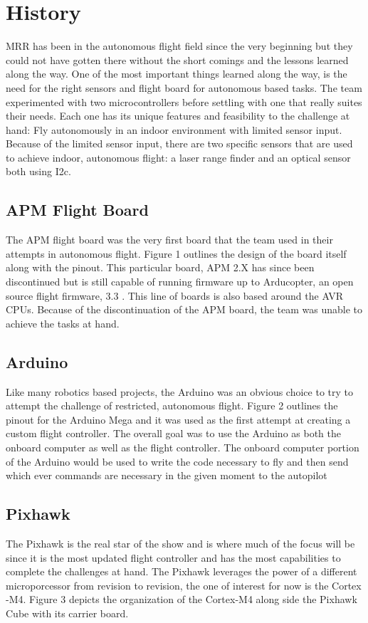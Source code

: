 \documentclass[conference,12pt, ]{IEEEtran}
\begin{document}
\section{History}
MRR has been in the autonomous flight field since the very beginning but they could not have gotten there without the short comings and the lessons learned along the way. One of the most important things learned along the way, is the need for the right sensors and flight board for autonomous based tasks. The team experimented with two microcontrollers before settling with one that really suites their needs. Each one has its unique features and feasibility to the challenge at hand: Fly autonomously in an indoor environment with limited sensor input. Because of the limited sensor input, there are two specific sensors that are used to achieve indoor, autonomous flight: a laser range finder and an optical sensor both using I2c.

\subsection{APM Flight Board}
The APM flight board was the very first board that the team used in their attempts in autonomous flight. Figure 1 outlines the design of the board itself along with the pinout. This particular board, APM 2.X has since been discontinued but is still capable of running firmware up to Arducopter, an open source flight firmware, 3.3 \cite{apm_board}. This line of boards is also based around the AVR CPUs. Because of the discontinuation of the APM board, the team was unable to achieve the tasks at hand. 

\subsection{Arduino}
Like many robotics based projects, the Arduino was an obvious choice to try to attempt the challenge of restricted, autonomous flight. Figure 2 outlines the pinout for the Arduino Mega and it was used as the first attempt at creating a custom flight controller. The overall goal was to use the Arduino as both the onboard computer as well as the flight controller. The onboard computer portion of the Arduino would be used to write the code necessary to fly and then send which ever commands are necessary in the given moment to the autopilot \cite{on_board}

\subsection{Pixhawk}
The Pixhawk is the real star of the show and is where much of the focus will be since it is the most updated flight controller and has the most capabilities to complete the challenges at hand. The Pixhawk leverages the power of a different microporcessor from revision to revision, the one of interest for now is the Cortex -M4. Figure 3 depicts the organization of the Cortex-M4 along side the Pixhawk Cube with its carrier board.
\end{document}
